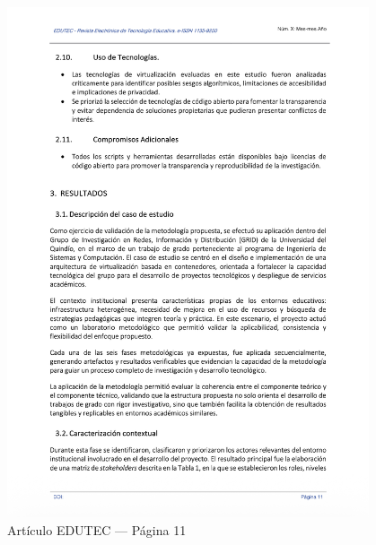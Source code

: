 \begin{figure}[H]
    \centering
    \begin{tcolorbox}[
        colback=white,
        colframe=gray!50,
        boxrule=1pt,
        arc=2pt,
        boxsep=5pt,
        left=3pt,
        right=3pt,
        top=3pt,
        bottom=3pt,
        drop shadow
    ]
        \includegraphics[width=0.95\textwidth,keepaspectratio]{apendices/EDUTEC/11.png}
    \end{tcolorbox}
    \caption{Artículo EDUTEC --- Página 11}\label{fig:edutec-pagina-11}
\end{figure}
\FloatBarrier

